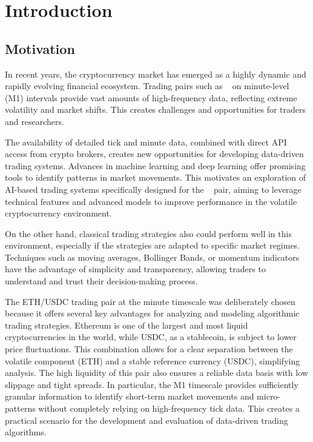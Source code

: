 \usepackage{hyperref}


\section{Introduction}

\subsection{Motivation}

In recent years, the cryptocurrency market has emerged as a highly dynamic and rapidly evolving financial ecosystem.
Trading pairs such as \ethusdc~ on minute-level (M1) intervals provide vast amounts of high-frequency data, reflecting extreme volatility and market shifts.
This creates challenges and opportunities for traders and researchers.

The availability of detailed tick and minute data, combined with direct API access from crypto brokers, creates new opportunities for developing data-driven trading systems.
Advances in machine learning and deep learning offer promising tools to identify patterns in market movements.
This motivates an exploration of AI-based trading systems specifically designed for the \ethusdc~ pair, aiming to leverage technical features and advanced models to improve performance in the volatile cryptocurrency environment.

On the other hand, classical trading strategies also could perform well in this environment, especially if the strategies are adapted to specific market regimes.
Techniques such as moving averages, Bollinger Bands, or momentum indicators have the advantage of simplicity and transparency, allowing traders to understand and trust their decision-making process.

The ETH/USDC trading pair at the minute timescale was deliberately chosen because it offers several key advantages for analyzing and modeling algorithmic trading strategies.
Ethereum is one of the largest and most liquid cryptocurrencies in the world, while USDC, as a stablecoin, is subject to lower price fluctuations.
This combination allows for a clear separation between the volatile component (ETH) and a stable reference currency (USDC), simplifying analysis.
The high liquidity of this pair also ensures a reliable data basis with low slippage and tight spreads.
In particular, the M1 timescale provides sufficiently granular information to identify short-term market movements and micro-patterns without completely relying on high-frequency tick data.
This creates a practical scenario for the development and evaluation of data-driven trading algorithms.


